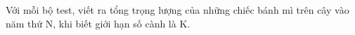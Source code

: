 Với mỗi bộ test, viết ra tổng trọng lượng của những chiếc bánh mì trên cây vào năm thứ N, khi biết giới hạn số cành là K.